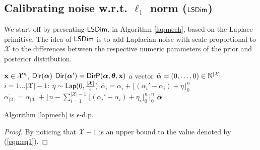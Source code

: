 \documentclass{article}
\begin{document}
\subsection{Calibrating noise w.r.t. $\ell_1$ norm ($\lapmech$)}
\label{sec_ell1_dim}
We start off by presenting $\lapmech$, in Algorithm \ref{lapmech}, based on the Laplace primitive.
The idea of $\lapmech$ is to add Laplacian noise with scale proportional to $\mathcal{X}$ to
the differences between the respective numeric parameters of the prior
and posterior distribution. 
\begin{algorithm}
  \caption{$\lapmech$}
  \label{lapmech}
  \begin{algorithmic}
  \INPUT $\textbf{x}\in\mathcal{X}^n$, $\mathsf{Dir}(\boldsymbol{\alpha})$
  \STATE {} $\mathsf{Dir}(\boldsymbol{\alpha}') = \mathsf{DirP}(\boldsymbol{\alpha},\boldsymbol{\theta},\textbf{x})$
  \STATE {} a vector $\tilde{\boldsymbol{\alpha}} = (0, \dots, 0 )\in \mathbb{N}^{|\mathcal{X}|}$ 
  \STATE {} $i = 1 \dots |\mathcal{X}| - 1$:
  \STATE \quad {} $\eta \sim \mathsf{Lap}(0, \frac{|\mathcal{X}|}{\epsilon})$
  \STATE \quad \quad  $\tilde{\alpha_i}=\alpha_i + \lfloor{(\alpha_i' - \alpha_i) + \eta}\rfloor^n_0$ 
  \STATE \quad $\tilde{\alpha_{|\mathcal{X}|}} = \alpha_{|\mathcal{X}|} + \lfloor n - \sum_{i = 1}^{|\mathcal{X}|-1}\lfloor{(\alpha_i' - \alpha_i) + \eta_i}\rfloor^n_0 \rfloor^n_0$
   $\tilde{\boldsymbol{\alpha}}$
  \end{algorithmic}
\end{algorithm}
\begin{lem}
  Algorithm \ref{lapmech} is $\epsilon$-d.p.
  \begin{proof} By noticing that $\mathcal{X}-1$ is an upper bound to the value denoted by (\ref{eqn:eq1}). \end{proof}
\end{lem}
\end{document}
